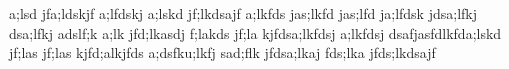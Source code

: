 a;lsd jfa;ldskjf a;lfdskj a;lskd jf;lkdsajf
a;lkfds jas;lkfd jas;lfd ja;lfdsk jdsa;lfkj
dsa;lfkj adslf;k a;lk jfd;lkasdj f;lakds jf;la
kjfdsa;lkfdsj a;lkfdsj dsafjasfdlkfda;lskd jf;las jf;las
kjfd;alkjfds a;dsfku;lkfj sad;flk jfdsa;lkaj
fds;lka jfds;lkdsajf
